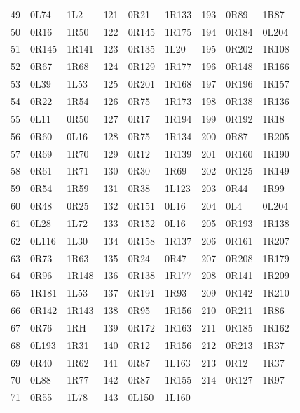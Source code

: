\begin{longtable}{@{}rll@{\qquad}rll@{\qquad}rll@{}}
49 & 0L74 & 1L2 & 121 & 0R21 & 1R133 & 193 & 0R89 & 1R87\\
50 & 0R16 & 1R50 & 122 & 0R145 & 1R175 & 194 & 0R184 & 0L204\\
51 & 0R145 & 1R141 & 123 & 0R135 & 1L20 & 195 & 0R202 & 1R108\\
52 & 0R67 & 1R68 & 124 & 0R129 & 1R177 & 196 & 0R148 & 1R166\\
53 & 0L39 & 1L53 & 125 & 0R201 & 1R168 & 197 & 0R196 & 1R157\\
54 & 0R22 & 1R54 & 126 & 0R75 & 1R173 & 198 & 0R138 & 1R136\\
55 & 0L11 & 0R50 & 127 & 0R17 & 1R194 & 199 & 0R192 & 1R18\\
56 & 0R60 & 0L16 & 128 & 0R75 & 1R134 & 200 & 0R87 & 1R205\\
57 & 0R69 & 1R70 & 129 & 0R12 & 1R139 & 201 & 0R160 & 1R190\\
58 & 0R61 & 1R71 & 130 & 0R30 & 1R69 & 202 & 0R125 & 1R149\\
59 & 0R54 & 1R59 & 131 & 0R38 & 1L123 & 203 & 0R44 & 1R99\\
60 & 0R48 & 0R25 & 132 & 0R151 & 0L16 & 204 & 0L4 & 0L204\\
61 & 0L28 & 1L72 & 133 & 0R152 & 0L16 & 205 & 0R193 & 1R138\\
62 & 0L116 & 1L30 & 134 & 0R158 & 1R137 & 206 & 0R161 & 1R207\\
63 & 0R73 & 1R63 & 135 & 0R24 & 0R47 & 207 & 0R208 & 1R179\\
64 & 0R96 & 1R148 & 136 & 0R138 & 1R177 & 208 & 0R141 & 1R209\\
65 & 1R181 & 1L53 & 137 & 0R191 & 1R93 & 209 & 0R142 & 1R210\\
66 & 0R142 & 1R143 & 138 & 0R95 & 1R156 & 210 & 0R211 & 1R86\\
67 & 0R76 & 1RH & 139 & 0R172 & 1R163 & 211 & 0R185 & 1R162\\
68 & 0L193 & 1R31 & 140 & 0R12 & 1R156 & 212 & 0R213 & 1R37\\
69 & 0R40 & 1R62 & 141 & 0R87 & 1L163 & 213 & 0R12 & 1R37\\
70 & 0L88 & 1R77 & 142 & 0R87 & 1R155 & 214 & 0R127 & 1R97\\
71 & 0R55 & 1L78 & 143 & 0L150 & 1L160 &  & & \\
\end{longtable}
\normalsize
